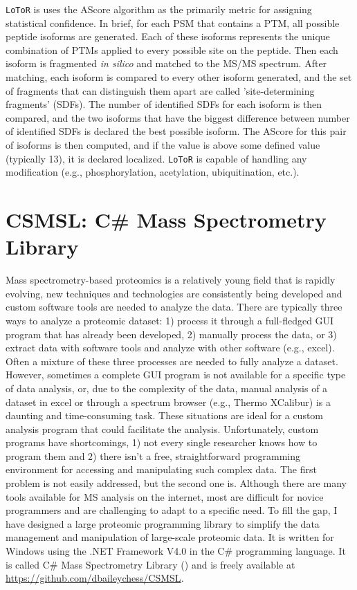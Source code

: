 \texttt{LoToR} is uses the AScore algorithm as the primarily metric for assigning statistical confidence.\cite{ascore} In brief, for each PSM that contains a PTM, all possible peptide isoforms are generated. Each of these isoforms represents the unique combination of PTMs applied to every possible site on the peptide. Then each isoform is fragmented \emph{in silico} and matched to the MS/MS spectrum. After matching, each isoform is compared to every other isoform generated, and the set of fragments that can distinguish them apart are called 'site-determining fragments' (SDFs). The number of identified SDFs for each isoform is then compared, and the two isoforms that have the biggest difference between number of identified SDFs is declared the best possible isoform. The AScore for this pair of isoforms is then computed, and if the value is above some defined value (typically 13), it is declared localized. \texttt{LoToR} is capable of handling any modification (e.g., phosphorylation, acetylation, ubiquitination, etc.). 

\section{CSMSL: C\# Mass Spectrometry Library}
Mass spectrometry-based proteomics is a relatively young field that is rapidly evolving, new techniques and technologies are consistently being developed and custom software tools are needed to analyze the data. There are typically three ways to analyze a proteomic dataset: 1) process it through a full-fledged GUI program that has already been developed, 2) manually process the data, or 3) extract data with software tools and analyze with other software (e.g., excel). Often a mixture of these three processes are needed to fully analyze a dataset. However, sometimes a complete GUI program is not available for a specific type of data analysis, or, due to the complexity of the data, manual analysis of a dataset in excel or through a spectrum browser (e.g., Thermo XCalibur) is a daunting and time-consuming task. These situations are ideal for a custom analysis program that could facilitate the analysis. Unfortunately, custom programs have shortcomings, 1) not every single researcher knows how to program them and 2) there isn't a free, straightforward programming environment for accessing and manipulating such complex data. The first problem is not easily addressed, but the second one is. Although there are many tools available for MS analysis on the internet, most are difficult for novice programmers and are challenging to adapt to a specific need. To fill the gap, I have designed a large proteomic programming library to simplify the data management and manipulation of large-scale proteomic data. It is written for Windows using the .NET Framework V4.0 in the C\# programming language. It is called C\# Mass Spectrometry Library (\csmsl{}) and is freely available at \url{https://github.com/dbaileychess/CSMSL}.

